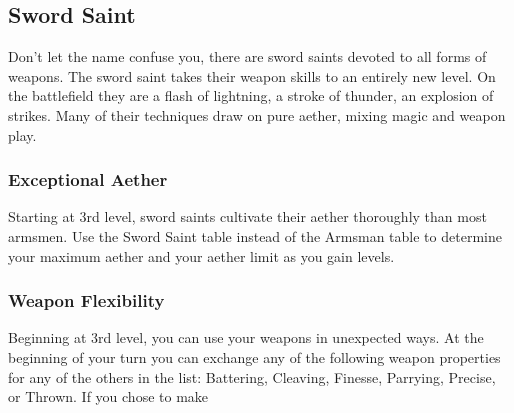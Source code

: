 \subsection{Sword Saint}
Don't let the name confuse you, there are sword saints devoted to all forms of weapons. The sword saint takes their weapon skills to an entirely new level. On the battlefield they are a flash of lightning, a stroke of thunder, an explosion of strikes. Many of their techniques draw on pure aether, mixing magic and weapon play.


\subsubsection{Exceptional Aether}
Starting at 3rd level, sword saints cultivate their aether thoroughly than most armsmen. Use the Sword Saint table instead of the Armsman table to determine your maximum aether and your aether limit as you gain levels.

\subsubsection{Weapon Flexibility}
Beginning at 3rd level, you can use your weapons in unexpected ways. At the beginning of your turn you can exchange any of the following weapon properties for any of the others in the list: Battering, Cleaving, Finesse, Parrying, Precise, or Thrown. If you chose to make 
